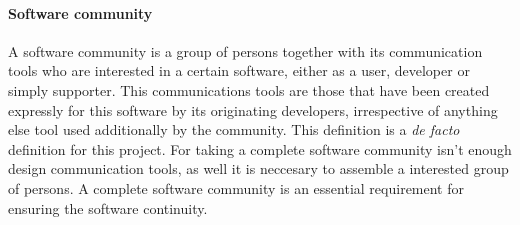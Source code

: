 \documentclass[twocolumn]{article}
\begin{document}
\paragraph{Software community}
A software community is a group of persons together
with its communication tools who are interested in a certain software,
either as a user, developer or simply supporter. This communications
tools are those that have been created expressly for this software by
its originating developers, irrespective of anything else tool used
additionally by the community. This definition is a \textit{de facto}
definition for this project. For taking a complete software community
isn't enough design communication tools, as well it is neccesary to
assemble a interested group of persons. A complete software community
is an essential requirement for ensuring the software continuity.



\end{document}
